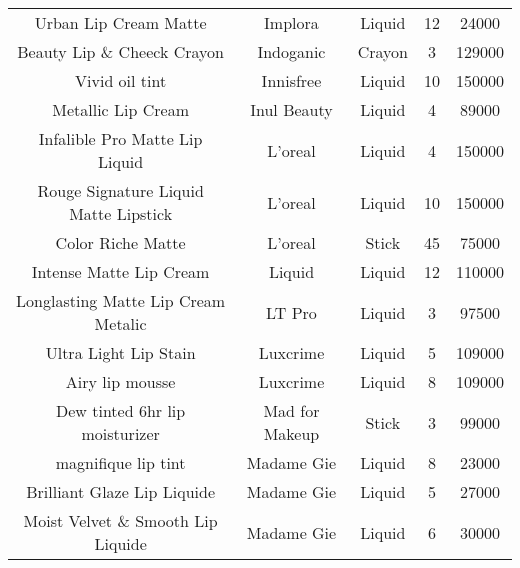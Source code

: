 \begin{table}[htbp]
\begin{tabular}{ccccc}
        Urban Lip Cream Matte               & Implora           & Liquid                       & 12              & 24000          \\
        Beauty Lip \& Cheeck Crayon         & Indoganic         & Crayon                       & 3               & 129000         \\
        Vivid oil tint                      & Innisfree         & Liquid                       & 10              & 150000         \\
        Metallic Lip Cream                  & Inul Beauty       & Liquid                       & 4               & 89000          \\
        Infalible Pro Matte Lip Liquid      & L'oreal           & Liquid                       & 4               & 150000         \\
        Rouge Signature Liquid Matte
        Lipstick                            & L'oreal           & Liquid                       & 10              & 150000         \\
        Color Riche Matte                   & L'oreal           & Stick                        & 45              & 75000          \\
        Intense Matte Lip Cream             & Liquid            & Liquid                       & 12              & 110000         \\
        Longlasting Matte Lip Cream Metalic & LT Pro            & Liquid                       & 3               & 97500          \\
        Ultra Light Lip Stain               & Luxcrime          & Liquid                       & 5               & 109000         \\
        Airy lip mousse                     & Luxcrime          & Liquid                       & 8               & 109000         \\
        Dew tinted 6hr lip moisturizer      & Mad for Makeup    & Stick                        & 3               & 99000          \\
        magnifique lip tint                 & Madame Gie        & Liquid                       & 8               & 23000          \\
        Brilliant Glaze Lip Liquide         & Madame Gie        & Liquid                       & 5               & 27000          \\
        Moist Velvet \& Smooth Lip Liquide  & Madame Gie        & Liquid                       & 6               & 30000          \\

\end{tabular}
\end{table}

